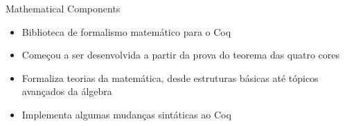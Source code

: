 \begin{frame}{Mathematical Components}
    \begin{itemize}
        \item Biblioteca de formalismo matemático para o Coq
        \item Começou a ser desenvolvida a partir da prova do teorema das quatro cores
        \item Formaliza teorias da matemática, desde estruturas básicas até tópicos avançados da álgebra \cite{assia_mahboubi_2022_7118596}
        \item Implementa algumas mudanças sintáticas ao Coq
    \end{itemize}
\end{frame}
